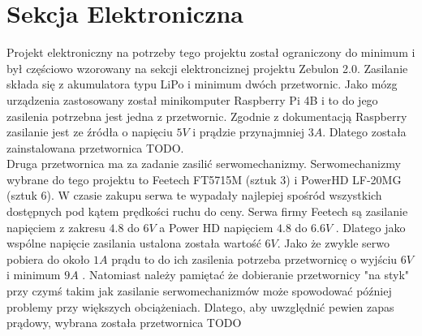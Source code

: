 \chapter{Sekcja Elektroniczna}
Projekt elektroniczny na potrzeby tego projektu został ograniczony do minimum i był częściowo wzorowany na sekcji elektronciznej projektu Zebulon 2.0. Zasilanie składa się z akumulatora typu LiPo i minimum dwóch przetwornic. Jako mózg urządzenia zastosowany został minikomputer Raspberry Pi 4B i to do jego zasilenia potrzebna jest jedna z przetwornic. Zgodnie z dokumentacją Raspberry zasilanie jest ze źródła o napięciu $5V$ i prądzie przynajmniej $3A$.\cite{RPI_power_sup} Dlatego została zainstalowana przetwornica TODO.\\

Druga przetwornica ma za zadanie zasilić serwomechanizmy. Serwomechanizmy wybrane do tego projektu to Feetech FT5715M (sztuk 3) i PowerHD LF-20MG (sztuk 6). W czasie zakupu serwa te wypadały najlepiej spośród wszystkich dostępnych pod kątem prędkości ruchu do ceny. Serwa firmy Feetech są zasilanie napięciem z zakresu $4.8$ do $6V$ \cite{feetech_docs} a Power HD napięciem $4.8$ do $6.6V$ \cite{powerhd_docs}. Dlatego jako wspólne napięcie zasilania ustalona została wartość $6V$. Jako że zwykle serwo pobiera do około $1A$ prądu to do ich zasilenia potrzeba przetwornicę o wyjściu $6V$ i minimum $9A$ \cite{Servo_power_sup}. Natomiast należy pamiętać że dobieranie przetwornicy "na styk" przy czymś takim jak zasilanie serwomechanizmów może spowodować później problemy przy większych obciążeniach. Dlatego, aby uwzględnić pewien zapas prądowy, wybrana została przetwornica TODO

